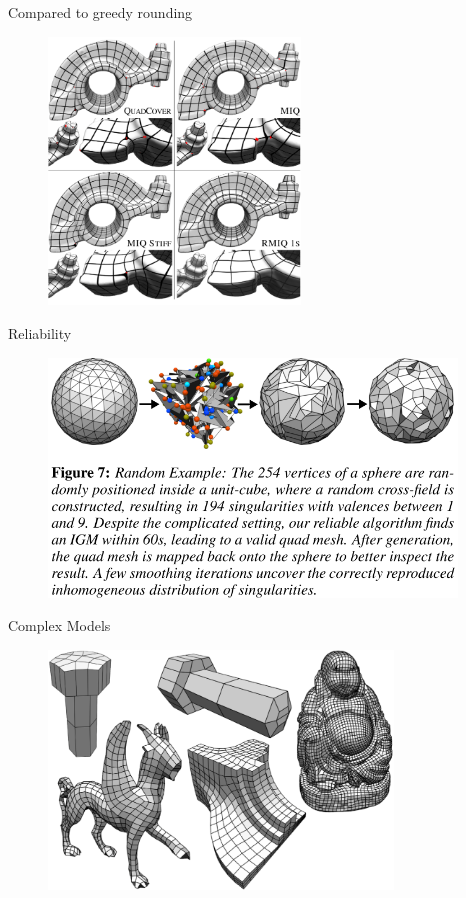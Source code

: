 \documentclass{beamer}
\begin{document}
\begin{frame}{Compared to greedy rounding}
\begin{figure}
\centering
\includegraphics[height=2.8in]{./img/result1.png}
\end{figure}
\end{frame}

\begin{frame}{Reliability}
\begin{figure}
\centering
\includegraphics[height=2.5in]{./img/result2.png}
\end{figure}
\end{frame}

\begin{frame}{Complex Models}
\begin{figure}
\centering
\includegraphics[height=2.5in]{./img/result3.png}
\end{figure}
\end{frame}
\end{document}
